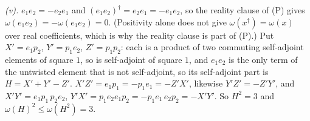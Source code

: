 \emph{(v).} $e_{1}e_{2} = -e_{2}e_{1}$ and $(e_{1}e_{2})^{\dagger} = e_{2}e_{1} = -e_{1}e_{2}$, so the reality clause of (P) gives $\omega(e_{1}e_{2}) = -\omega(e_{1}e_{2}) = 0$. (Positivity alone does not give $\omega(x^{\dagger}) = \omega(x)$ over real coefficients, which is why the reality clause is part of (P).) Put $X' = e_{1}p_{2}$, $Y' = p_{1}e_{2}$, $Z' = p_{1}p_{2}$: each is a product of two commuting self-adjoint elements of square $1$, so is self-adjoint of square $1$, and $e_{1}e_{2}$ is the only term of the untwisted element that is not self-adjoint, so its self-adjoint part is $H = X' + Y' - Z'$. $X'Z' = e_{1}p_{1} = -p_{1}e_{1} = -Z'X'$, likewise $Y'Z' = -Z'Y'$, and $X'Y' = e_{1}p_{1}\,p_{2}e_{2}$, $Y'X' = p_{1}e_{2}e_{1}p_{2} = -p_{1}e_{1}\,e_{2}p_{2} = -X'Y'$. So $H^{2} = 3$ and $\omega(H)^{2} \le \omega(H^{2}) = 3$.
